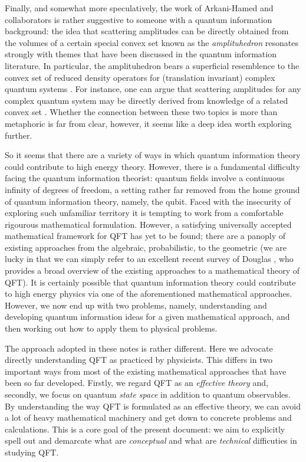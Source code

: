 \documentclass[11pt]{amsart}
\theoremstyle{plain}%
\theoremstyle{definition}
\theoremstyle{remark}
\begin{document}
Finally, and somewhat more speculatively, the work \cite{arkani-hamed_what_2010,arkani-hamed_into_2014,arkani-hamed_tree_2008,arkani-hamed_scattering_2012,arkani-hamed_all-loop_2011,arkani-hamed_amplituhedron_2014,arkani-hamed_s-matrix_2010,arkani-hamed_what_2010} of Arkani-Hamed and collaborators is rather suggestive to someone with a quantum information background: the idea that scattering amplitudes can be directly obtained from the volumes of a certain special convex set known as the \emph{amplituhedron} resonates strongly with themes that have been discussed in the quantum information literature. In particular, the amplituhedron bears a superficial resemblence to the convex set of reduced density operators for (translation invariant) complex quantum systems \cite{verstraete_matrix_2006,zauner_symmetry_2014}. For instance, one can argue that scattering amplitudes for any complex quantum system may be directly derived from knowledge of a related convex set \cite{osborne_tobiasosborne}. Whether the connection between these two topics is more than metaphoric is far from clear, however, it seems like a deep idea worth exploring further. 

So it seems that there are a variety of ways in which quantum information theory could contribute to high energy theory. However, there is a fundamental difficulty facing the quantum information theorist:  quantum fields involve a continuous infinity of degrees of freedom, a setting rather far removed from the home ground of quantum information theory, namely, the qubit. Faced with the insecurity of exploring such unfamiliar territory it is tempting to work from a comfortable rigourous mathematical formulation. However,  a satisfying universally accepted mathematical framework for QFT has yet to be found; there are a panoply of existing approaches from the algebraic, probabilistic, to the geometric (we are lucky in that we can simply refer to an excellent recent survey of Douglas \cite{douglas_foundations_2012}, who provides a broad overview of the existing approaches to a mathematical theory of QFT). It is certainly possible that quantum information theory could contribute to high energy physics via one of the aforementioned mathematical approaches. However, we now end up with two problems, namely, understanding and developing quantum information ideas for a given mathematical approach, and then working out how to apply them to physical problems. 

The approach adopted in these notes is rather different. Here we advocate directly understanding QFT as practiced by physicists. This differs in two important ways from most of the existing mathematical approaches that have been so far developed. Firstly, we regard QFT as an \emph{effective theory} and, secondly, we focus on quantum \emph{state space} in addition to quantum observables. By understanding the way QFT is formulated as an effective theory, we can avoid a lot of heavy mathematical machinery and get down to concrete problems and calculations. This is a core goal of the present document: we aim to explicitly spell out and demarcate what are \emph{conceptual} and what are \emph{technical} difficuties in studying QFT.
\end{document}
